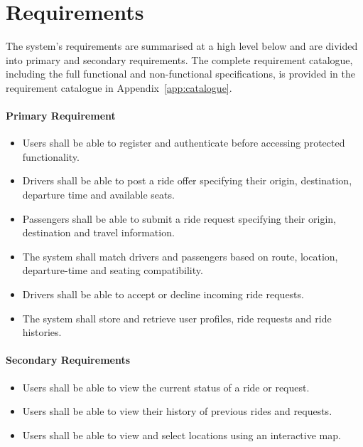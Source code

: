 \section{Requirements}

The system's requirements are summarised at a high level below and are divided into primary and secondary requirements. The complete requirement catalogue, including the full functional and non-functional specifications, is provided in the requirement catalogue in Appendix~\ref{app:catalogue}.

\paragraph{Primary Requirement}
\begin{itemize}
  \item Users shall be able to register and authenticate before accessing protected functionality.
	\item Drivers shall be able to post a ride offer specifying their origin, destination, departure time and available seats.
	\item Passengers shall be able to submit a ride request specifying their origin, destination and travel information.
	\item The system shall match drivers and passengers based on route, location, departure-time and seating compatibility.
	\item Drivers shall be able to accept or decline incoming ride requests.
	\item The system shall store and retrieve user profiles, ride requests and ride histories.
\end{itemize}

\paragraph{Secondary Requirements}
\begin{itemize}
  \item Users shall be able to view the current status of a ride or request.
	\item Users shall be able to view their history of previous rides and requests.
	\item Users shall be able to view and select locations using an interactive map.
\end {itemize}